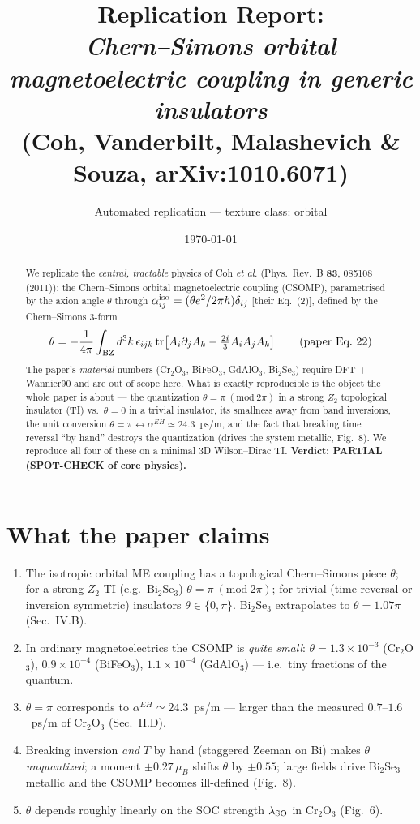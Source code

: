 \documentclass[11pt]{article}
\title{Replication Report: \\ \emph{Chern--Simons orbital magnetoelectric
coupling in generic insulators}\\ (Coh, Vanderbilt, Malashevich \& Souza,
arXiv:1010.6071)}
\author{Automated replication --- texture class: orbital}
\date{\today}
\begin{document}
\maketitle

\begin{abstract}
We replicate the \emph{central, tractable} physics of Coh \emph{et al.}
(Phys.\ Rev.\ B \textbf{83}, 085108 (2011)): the Chern--Simons orbital
magnetoelectric coupling (CSOMP), parametrised by the axion angle
$\theta$ through $\alpha^{\rm iso}_{ij}=(\theta e^2/2\pi h)\delta_{ij}$
[their Eq.~(2)], defined by the Chern--Simons 3-form
\begin{equation}
\theta=-\frac{1}{4\pi}\int_{\rm BZ} d^3k\,\epsilon_{ijk}\,
\mathrm{tr}\!\left[A_i\partial_j A_k-\tfrac{2i}{3}A_iA_jA_k\right]
\tag{paper Eq.~22}
\end{equation}
The paper's \emph{material} numbers (Cr$_2$O$_3$, BiFeO$_3$, GdAlO$_3$,
Bi$_2$Se$_3$) require DFT + Wannier90 and are out of scope here. What is
exactly reproducible is the object the whole paper is about --- the
quantization $\theta=\pi\ (\mathrm{mod}\ 2\pi)$ in a strong $Z_2$
topological insulator (TI) vs.\ $\theta=0$ in a trivial insulator, its
smallness away from band inversions, the unit conversion
$\theta=\pi\leftrightarrow\alpha^{EH}\simeq24.3$~ps/m, and the fact that
breaking time reversal ``by hand'' destroys the quantization (drives the
system metallic, Fig.~8). We reproduce all four of these on a minimal 3D
Wilson--Dirac TI. \textbf{Verdict: PARTIAL (SPOT-CHECK of core physics).}
\end{abstract}

\section{What the paper claims}
\begin{enumerate}
\item[(A)] The isotropic orbital ME coupling has a topological
Chern--Simons piece $\theta$; for a strong $Z_2$ TI (e.g.\ Bi$_2$Se$_3$)
$\theta=\pi\ (\mathrm{mod}\ 2\pi)$; for trivial (time-reversal or
inversion symmetric) insulators $\theta\in\{0,\pi\}$. Bi$_2$Se$_3$
extrapolates to $\theta=1.07\pi$ (Sec.~IV.B).
\item[(B)] In ordinary magnetoelectrics the CSOMP is \emph{quite small}:
$\theta=1.3\times10^{-3}$ (Cr$_2$O$_3$), $0.9\times10^{-4}$ (BiFeO$_3$),
$1.1\times10^{-4}$ (GdAlO$_3$) --- i.e.\ tiny fractions of the quantum.
\item[(C)] $\theta=\pi$ corresponds to $\alpha^{EH}\simeq24.3$~ps/m ---
larger than the measured $0.7$--$1.6$~ps/m of Cr$_2$O$_3$ (Sec.~II.D).
\item[(D)] Breaking inversion \emph{and} $T$ by hand (staggered Zeeman on
Bi) makes $\theta$ \emph{unquantized}; a moment $\pm0.27\,\mu_B$ shifts
$\theta$ by $\pm0.55$; large fields drive Bi$_2$Se$_3$ metallic and the
CSOMP becomes ill-defined (Fig.~8).
\item[(E)] $\theta$ depends roughly linearly on the SOC strength
$\lambda_{\rm SO}$ in Cr$_2$O$_3$ (Fig.~6).
\end{enumerate}
\end{document}
